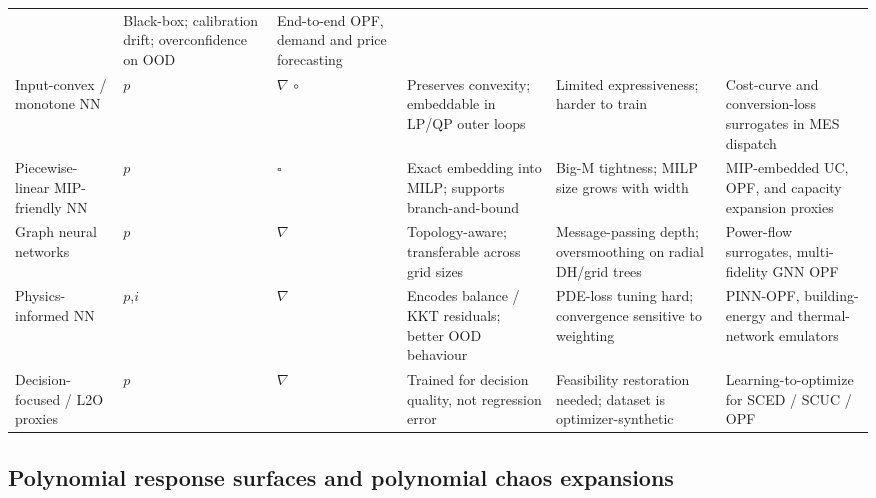 \begin{table}[!t]
\begin{tabularx}{\textwidth}{@{}L{0.16\textwidth} C{0.05\textwidth} C{0.08\textwidth} L{0.21\textwidth} L{0.20\textwidth} L{0.22\textwidth}@{}}
      & Black-box; calibration drift; overconfidence on OOD
      & End-to-end OPF, demand and price forecasting
        \cite{Chen20244723,Chen2022,Wu2022231,Xu20223066,Guo20222057,Li202359995} \\
    Input-convex / monotone NN
      & $p$ & $\nabla$ $\circ$
      & Preserves convexity; embeddable in LP/QP outer loops
      & Limited expressiveness; harder to train
      & Cost-curve and conversion-loss surrogates in MES dispatch
        \cite{Liu20242534,Wu2024391,Pang2023,Lin2023} \\
    Piecewise-linear MIP-friendly NN
      & $p$ & $\square$
      & Exact embedding into MILP; supports branch-and-bound
      & Big-M tightness; MILP size grows with width
      & MIP-embedded UC, OPF, and capacity expansion proxies
        \cite{Wu2022231,Liu20223726,Liang20246508,Pang2023} \\
    Graph neural networks
      & $p$    & $\nabla$
      & Topology-aware; transferable across grid sizes
      & Message-passing depth; oversmoothing on radial DH/grid trees
      & Power-flow surrogates, multi-fidelity GNN OPF
        \cite{Park2019,Su2022315,Khayambashi202453,Taghizadeh2024} \\
    Physics-informed NN
      & $p$,$i$ & $\nabla$
      & Encodes balance / KKT residuals; better OOD behaviour
      & PDE-loss tuning hard; convergence sensitive to weighting
      & PINN-OPF, building-energy and thermal-network emulators
        \cite{Park2019,Petrova2025,Du2025,Chaudhry2024} \\
    Decision-focused / L2O proxies
      & $p$ & $\nabla$
      & Trained for decision quality, not regression error
      & Feasibility restoration needed; dataset is optimizer-synthetic
      & Learning-to-optimize for SCED / SCUC / OPF
        \cite{Wu2022231,Chen20244723,Chen2022,Liu20223726,Wu2024391,Liang20246508} \\
    \bottomrule
  \end{tabularx}
\end{table}


\subsection{Polynomial response surfaces and polynomial chaos
expansions}
\label{sec:tax:rsm}

